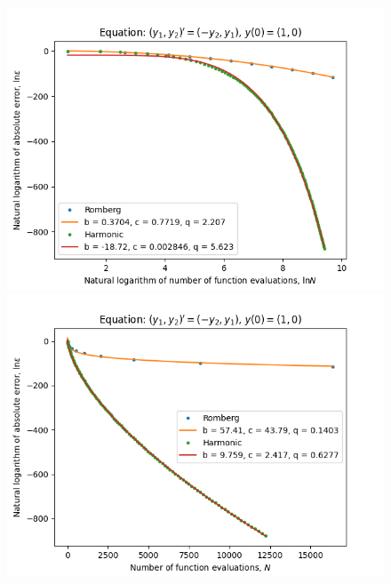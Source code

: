 \begin{figure}[H]
\centering
\begin{minipage}{0.45\textwidth}
\centering
\includegraphics[scale=0.45]{emr_plots/rotation_hp_log_log_pow_fit_trend.png}
\end{minipage}
\begin{minipage}{0.45\textwidth}
\centering
\includegraphics[scale=0.45]{emr_plots/rotation_hp_trend.png}
\end{minipage}
\end{figure}

